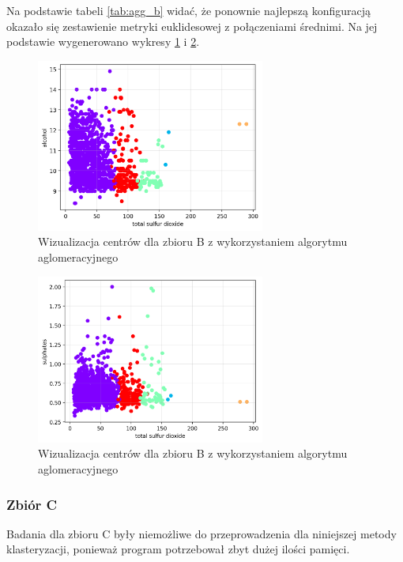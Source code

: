 \documentclass[a4paper,11pt]{article}
\begin{document}
        Na podstawie tabeli \ref{tab:agg_b} widać, że ponownie najlepszą konfiguracją okazało się zestawienie metryki euklidesowej z połączeniami średnimi. Na jej podstawie wygenerowano wykresy \ref{tab:agg_b_vis1} i \ref{tab:agg_b_vis2}.
        
        \begin{figure}[H] %
            \centering
            \includegraphics[width=0.67\textwidth]{images2/agglo/d2_alco.png}
            \caption{Wizualizacja centrów dla zbioru B z wykorzystaniem algorytmu aglomeracyjnego}
            \label{tab:agg_b_vis1}
        \end{figure}
        
        \begin{figure}[H] %
            \centering
            \includegraphics[width=0.67\textwidth]{images2/agglo/d2_sulf.png}
            \caption{Wizualizacja centrów dla zbioru B z wykorzystaniem algorytmu aglomeracyjnego}
            \label{tab:agg_b_vis2}
        \end{figure}
    
    \subsubsection*{Zbiór C}
        Badania dla zbioru C były niemożliwe do przeprowadzenia dla niniejszej metody klasteryzacji, ponieważ program potrzebował zbyt dużej ilości pamięci.
\end{document}
